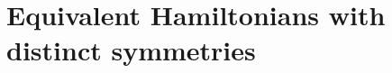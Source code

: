 \documentclass[12pt, a4paper]{report}
\newenvironment{Figure}
    {\par\medskip\noindent\minipage{\linewidth}}
    {\endminipage\par\medskip}
\begin{document}






\chapter{Equivalent Hamiltonians with distinct symmetries}\label{Equiv}
\end{document}
